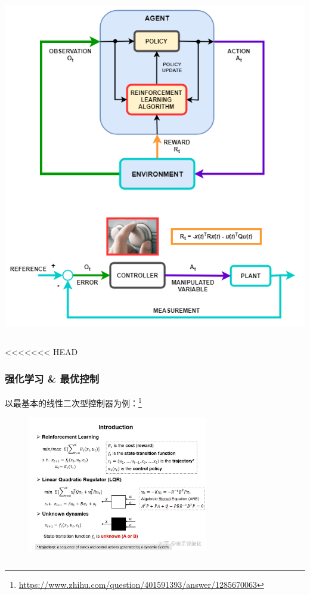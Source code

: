 \documentclass[12pt,AutoFakeBold,aspectratio=43,mathserif]{beamer}
\begin{document}
\begin{frame}
\begin{columns}
\begin{column}{.4\linewidth}
\begin{frame}
\begin{columns}
\begin{column}{.5\linewidth}
                \includegraphics[width=.5\paperwidth]{figures/rl_for_control_systems.png}
            \end{column}
        \end{columns}
    \end{frame}
<<<<<<< HEAD
    \begin{frame}
        \frametitle{强化学习 \& 最优控制}
        以最基本的线性二次型控制器为例：\footnote{\url{https://www.zhihu.com/question/401591393/answer/1285670063}}
        \begin{figure}[htbp]
            \setlength{\abovecaptionskip}{0.cm}
            \setlength{\belowcaptionskip}{-0.cm}
            \centering
            \vspace{-0.3cm}
            \setlength{\abovecaptionskip}{0.cm}
            \setlength{\belowcaptionskip}{-0.cm}
            \includegraphics[width=0.7\textwidth]{figures/3-5.jpg}
        \end{figure}
        

\end{frame}
\end{column}
\end{columns}
\end{frame}
\end{document}
